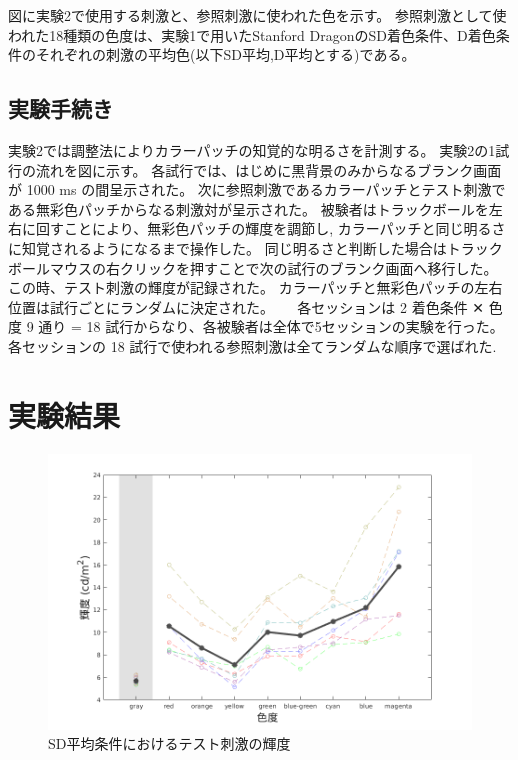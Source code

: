         図に実験2で使用する刺激と、参照刺激に使われた色を示す。
        参照刺激として使われた18種類の色度は、実験1で用いたStanford DragonのSD着色条件、D着色条件のそれぞれの刺激の平均色(以下SD平均,D平均とする)である。

    \subsection{実験手続き}

        実験2では調整法によりカラーパッチの知覚的な明るさを計測する。
        実験2の1試行の流れを図に示す。
        各試行では、はじめに黒背景のみからなるブランク画面が 1000 ms の間呈示された。
        次に参照刺激であるカラーパッチとテスト刺激である無彩色パッチからなる刺激対が呈示された。
        被験者はトラックボールを左右に回すことにより、無彩色パッチの輝度を調節し, カラーパッチと同じ明るさに知覚されるようになるまで操作した。
        同じ明るさと判断した場合はトラックボールマウスの右クリックを押すことで次の試行のブランク画面へ移行した。
        この時、テスト刺激の輝度が記録された。
        カラーパッチと無彩色パッチの左右位置は試行ごとにランダムに決定された。
        　
        各セッションは 2 着色条件 ✕ 色度 9 通り = 18 試行からなり、各被験者は全体で5セッションの実験を行った。
        各セッションの 18 試行で使われる参照刺激は全てランダムな順序で選ばれた.

\section{実験結果}

    \begin{figure}
        \centering
        \includegraphics[width=14.0cm]{./img/ex2_res_SD_p.png}
        \caption{SD平均条件におけるテスト刺激の輝度}
        \label{ex2_SD}
    \end{figure}

